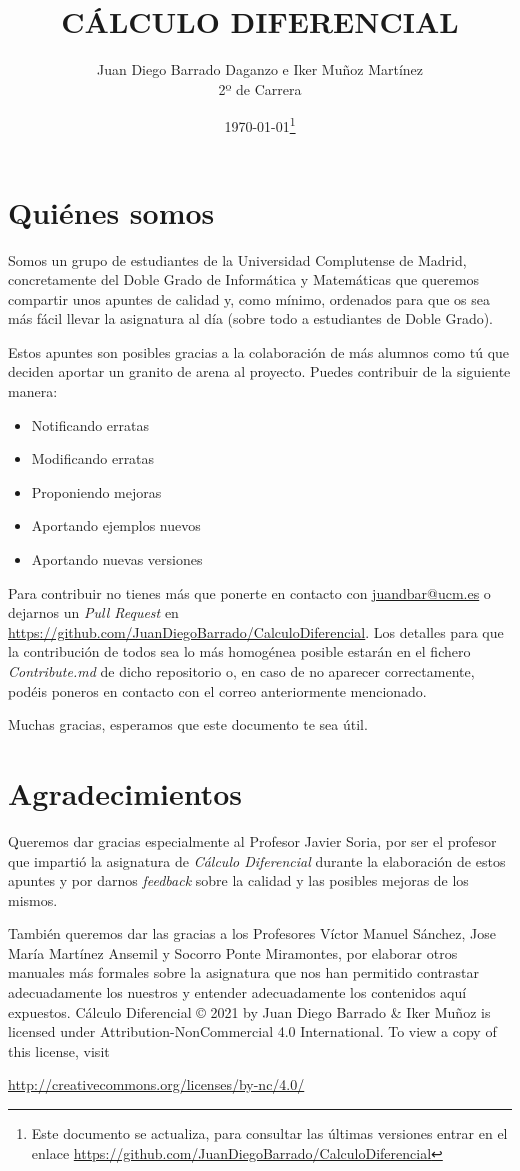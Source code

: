 \documentclass[10pt,a4paper,openright]{book}
\title{\Huge CÁLCULO DIFERENCIAL}
\author{Juan Diego Barrado Daganzo e Iker Muñoz Martínez\\2º de Carrera} %
\date{\today\footnote{Este documento se actualiza, para consultar las últimas versiones entrar en el enlace \url{https://github.com/JuanDiegoBarrado/CalculoDiferencial}}}
\theoremstyle{break}
\begin{document}
\maketitle
\setcounter{tocdepth}{3}%

\frontmatter
\section*{Quiénes somos}
Somos un grupo de estudiantes de la Universidad Complutense de Madrid, concretamente del Doble Grado de Informática y Matemáticas que queremos compartir unos apuntes de calidad y, como mínimo, ordenados para que os sea más fácil llevar la asignatura al día (sobre todo a estudiantes de Doble Grado).

Estos apuntes son posibles gracias a la colaboración de más alumnos como tú que deciden aportar un granito de arena al proyecto. Puedes contribuir de la siguiente manera:
\begin{itemize}
\item Notificando erratas
\item Modificando erratas
\item Proponiendo mejoras
\item Aportando ejemplos nuevos
\item Aportando nuevas versiones
\end{itemize}
Para contribuir no tienes más que ponerte en contacto con \href{mailto:juandbar@ucm.es}{juandbar@ucm.es} o dejarnos un \textit{Pull Request} en \url{https://github.com/JuanDiegoBarrado/CalculoDiferencial}. Los detalles para que la contribución de todos sea lo más homogénea posible estarán en el fichero \textit{Contribute.md} de dicho repositorio o, en caso de no aparecer correctamente, podéis poneros en contacto con el correo anteriormente mencionado.

Muchas gracias, esperamos que este documento te sea útil.

\section*{Agradecimientos}
Queremos dar gracias especialmente al Profesor Javier Soria, por ser el profesor que impartió la asignatura de \textit{Cálculo Diferencial} durante la elaboración de estos apuntes y por darnos \textit{feedback} sobre la calidad y las posibles mejoras de los mismos.

También queremos dar las gracias a los Profesores Víctor Manuel Sánchez, Jose María Martínez Ansemil y Socorro Ponte Miramontes, por elaborar otros manuales más formales sobre la asignatura que nos han permitido contrastar adecuadamente los nuestros y entender adecuadamente los contenidos aquí expuestos.
\vfill
Cálculo Diferencial © 2021 by Juan Diego Barrado \& Iker Muñoz is licensed under Attribution-NonCommercial 4.0 International. To view a copy of this license, visit
\begin{center}
\url{http://creativecommons.org/licenses/by-nc/4.0/}
\end{center}
\end{document}
